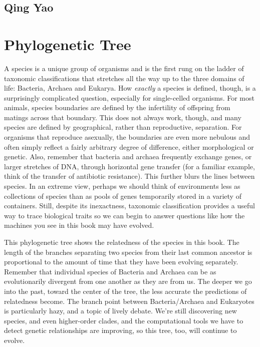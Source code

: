 \documentclass[]{tufte-book}
\begin{document}
\hypertarget{qing_yao}{%
\section*{Qing Yao}\label{qing_yao}}

\hypertarget{tree}{%
\chapter{Phylogenetic Tree}\label{tree}}

A species is a unique group of organisms and is the first rung on the ladder of taxonomic classifications that stretches all the way up to the three domains of life: Bacteria, Archaea and Eukarya. How \emph{exactly} a species is defined, though, is a surprisingly complicated question, especially for single-celled organisms. For most animals, species boundaries are defined by the infertility of offspring from matings across that boundary. This does not always work, though, and many species are defined by geographical, rather than reproductive, separation. For organisms that reproduce asexually, the boundaries are even more nebulous and often simply reflect a fairly arbitrary degree of difference, either morphological or genetic. Also, remember that bacteria and archaea frequently exchange genes, or larger stretches of DNA, through horizontal gene transfer (for a familiar example, think of the transfer of antibiotic resistance). This further blurs the lines between species. In an extreme view, perhaps we should think of environments less as collections of species than as pools of genes temporarily stored in a variety of containers. Still, despite its inexactness, taxonomic classification provides a useful way to trace biological traits so we can begin to answer questions like how the machines you see in this book may have evolved.

This phylogenetic tree shows the relatedness of the species in this book. The length of the branches separating two species from their last common ancestor is proportional to the amount of time that they have been evolving separately. Remember that individual species of Bacteria and Archaea can be as evolutionarily divergent from one another as they are from us. The deeper we go into the past, toward the center of the tree, the less accurate the predictions of relatedness become. The branch point between Bacteria/Archaea and Eukaryotes is particularly hazy, and a topic of lively debate. We're still discovering new species, and even higher-order clades, and the computational tools we have to detect genetic relationships are improving, so this tree, too, will continue to evolve.
\end{document}
